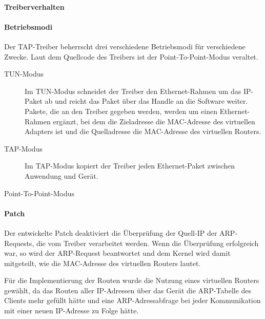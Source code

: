\paragraph{Treiberverhalten}

\paragraph{Betriebsmodi}
Der TAP-Treiber beherrscht drei verschiedene Betriebsmodi für verschiedene Zwecke.
Laut dem Quellcode des Treibers ist der Point-To-Point-Modus veraltet.
\begin{description}
\item [TUN-Modus] Im TUN-Modus schneidet der Treiber den Ethernet-Rahmen um das IP-Paket ab
und reicht das Paket über das Handle an die Software weiter. Pakete, die an den Treiber gegeben werden, werden um einen Ethernet-Rahmen
ergänzt, bei dem die Zieladresse die MAC-Adresse des virtuellen Adapters ist und die Quelladresse die MAC-Adresse des virtuellen Routers.
\item [TAP-Modus] Im TAP-Modus kopiert der Treiber jeden Ethernet-Paket zwischen Anwendung und Gerät.
\item [Point-To-Point-Modus]
\end{description}
\paragraph{Patch}
Der entwickelte Patch deaktiviert die Überprüfung der Quell-IP der ARP-Requests, die
vom Treiber verarbeitet werden. Wenn die Überprüfung erfolgreich war, so wird der ARP-Request
beantwortet und dem Kernel wird damit mitgeteilt, wie die MAC-Adresse des virtuellen Routers lautet.

Für die Implementierung der Routen wurde die Nutzung eines virtuellen Routers gewählt,
da das Routen aller \ac{IP}-Adressen über das Gerät die \ac{ARP}-Tabelle des Clients
mehr gefüllt hätte und eine \ac{ARP}-Adressabfrage bei jeder Kommunikation mit einer neuen
\ac{IP}-Adresse zu Folge hätte.

